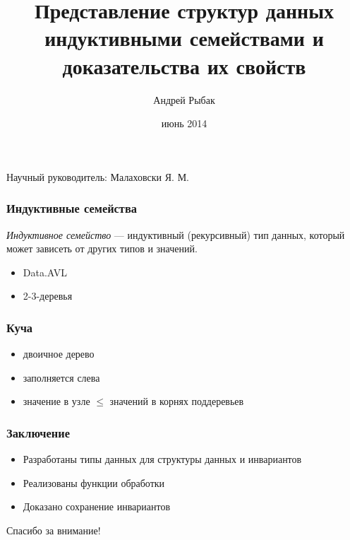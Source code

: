 \documentclass[17pt]{beamer}
\title{Представление структур данных индуктивными семействами и доказательства их свойств}
\institute{НИУ ИТМО}
\author{Андрей Рыбак}
\date{
июнь 2014
}
\begin{document}
{
\fontsize{14pt}{14pt}\selectfont
{}
\begin{frame}
  \maketitle
  \begin{flushright}
    Научный руководитель: Малаховски Я. М.
  \end{flushright}
\end{frame}
}

\begin{frame}
    \frametitle{Индуктивные семейства}
    \emph{Индуктивное семейство} — индуктивный (рекурсивный) тип данных,
        который может зависеть от других типов и значений.
    \pause
    \begin{itemize}
        \item Data.AVL
        \item 2-3-деревья
    \end{itemize}
\end{frame}

\AgdaHide{

}

\begin{frame}
    \frametitle{Куча}
    \begin{itemize}
        \item двоичное дерево
        \item заполняется слева
        \item значение в узле $ \leq $ значений в корнях поддеревьев
    \end{itemize}
\end{frame}

\fontsize{14pt}{14pt}\selectfont


\begin{frame}
    \frametitle{Заключение}
    \begin{itemize}
        \item Разработаны типы данных для структуры данных и инвариантов
        \item Реализованы функции обработки
        \item Доказано сохранение инвариантов
    \end{itemize}
\end{frame}

\begin{frame}
    \begin{center}
        \Large Спасибо за внимание!
    \end{center}
\end{frame}
\end{document}
